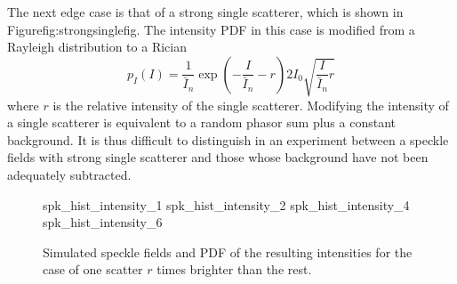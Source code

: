 The next edge case is that of a strong single scatterer, which is shown in 
Figure{fig:strongsinglefig}.  The intensity PDF in this case is modified
from a Rayleigh distribution to a Rician 
\begin{equation}
p_I(I) = \frac{1}{\bar{I}_n} \exp\left(-\frac{I}{\bar{I}_n} - r\right) 2 I_0
\sqrt{\frac{I}{\bar{I}_n} r}
\label{ricedpf}
\end{equation}
where $r$ is the relative intensity of the single scatterer.  Modifying the
intensity of a single scatterer is equivalent to a random phasor sum plus a
constant background.  It is thus difficult to distinguish in an experiment
between a speckle fields with strong single scatterer and those whose
background have not been adequately subtracted.
\begin{figure}[ht]
\centering
{spk_hist_intensity_1}
{spk_hist_intensity_2}
{spk_hist_intensity_4}
{spk_hist_intensity_6}
\caption{Simulated speckle fields and PDF of the resulting intensities for
the case of one scatter $r$ times brighter than the rest.}
\label{fig:strongsinglefig}
\end{figure}
